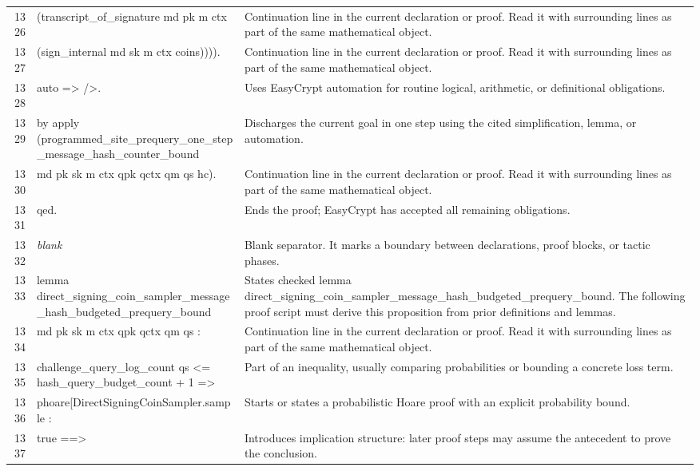\documentclass[10pt]{article}
\begin{document}
\begin{longtable}{r L{0.53\textwidth} L{0.37\textwidth}}
1326 & {\ttfamily\scriptsize       (transcript\_of\_signature md pk m ctx} & Continuation line in the current declaration or proof.  Read it with surrounding lines as part of the same mathematical object. \\
1327 & {\ttfamily\scriptsize         (sign\_internal md sk m ctx coins)))).} & Continuation line in the current declaration or proof.  Read it with surrounding lines as part of the same mathematical object. \\
1328 & {\ttfamily\scriptsize auto => />.} & Uses EasyCrypt automation for routine logical, arithmetic, or definitional obligations. \\
1329 & {\ttfamily\scriptsize by apply (programmed\_site\_prequery\_one\_step\_message\_hash\_counter\_bound} & Discharges the current goal in one step using the cited simplification, lemma, or automation. \\
1330 & {\ttfamily\scriptsize             md pk sk m ctx qpk qctx qm qs hc).} & Continuation line in the current declaration or proof.  Read it with surrounding lines as part of the same mathematical object. \\
1331 & {\ttfamily\scriptsize qed.} & Ends the proof; EasyCrypt has accepted all remaining obligations. \\
1332 & {\ttfamily\scriptsize \emph{blank}} & Blank separator.  It marks a boundary between declarations, proof blocks, or tactic phases. \\
1333 & {\ttfamily\scriptsize lemma direct\_signing\_coin\_sampler\_message\_hash\_budgeted\_prequery\_bound} & States checked lemma direct\_signing\_coin\_sampler\_message\_hash\_budgeted\_prequery\_bound.  The following proof script must derive this proposition from prior definitions and lemmas. \\
1334 & {\ttfamily\scriptsize   md pk sk m ctx qpk qctx qm qs :} & Continuation line in the current declaration or proof.  Read it with surrounding lines as part of the same mathematical object. \\
1335 & {\ttfamily\scriptsize   challenge\_query\_log\_count qs <= hash\_query\_budget\_count + 1 =>} & Part of an inequality, usually comparing probabilities or bounding a concrete loss term. \\
1336 & {\ttfamily\scriptsize   phoare[DirectSigningCoinSampler.sample :} & Starts or states a probabilistic Hoare proof with an explicit probability bound. \\
1337 & {\ttfamily\scriptsize     true ==>} & Introduces implication structure: later proof steps may assume the antecedent to prove the conclusion. \\

\end{longtable}
\end{document}
